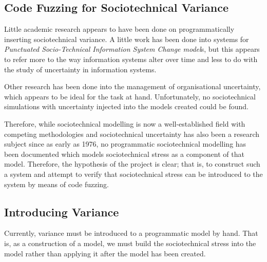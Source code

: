 \subsection{Code Fuzzing for Sociotechnical Variance}
Little academic research appears to have been done on programmatically inserting sociotechnical variance. A little work has been done into systems for \emph{Punctuated Socio-Technical Information System Change model}s\cite{Lyytinen2008}, but this appears to refer more to the way information systems alter over time and less to do with the study of uncertainty in information systems. \par
Other research has been done into the management of organisational uncertainty\cite{Grote2004}\cite{Herrmann1999}, which appears to be ideal for the task at hand. Unfortunately, no sociotechnical simulations with uncertainty injected into the models created could be found. \par
Therefore, while sociotechnical modelling is now a well-established field with competing methodologies and sociotechnical uncertainty has also been a research subject since as early as 1976\cite{Susman1976}, no programmatic sociotechnical modelling has been documented which models sociotechnical stress as a component of that model. Therefore, the hypothesis of the project is clear; that is, to construct such a system and attempt to verify that sociotechnical stress can be introduced to the system by means of code fuzzing. \par


\subsection{Introducing Variance}
\label{Variance_research}
Currently, variance must be introduced to a programmatic model by hand. That is, as a construction of a model, we must build the sociotechnical stress into the model rather than applying it after the model has been created. \par
 \par

